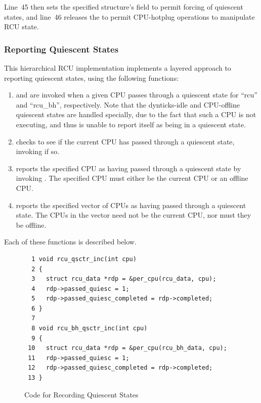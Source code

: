 Line~45 then sets the specified  structure's 
field to permit forcing of quiescent states, and
line~46 releases the  to permit CPU-hotplug
operations to manipulate RCU state.

\subsubsection{Reporting Quiescent States}
\label{app:rcuimpl:rcutreewt:Reporting Quiescent States}

This hierarchical RCU implementation implements a layered approach
to reporting quiescent states, using the following functions:
\begin{enumerate}
\item	{} and 
	are invoked when a given CPU passes through a
	quiescent state for ``rcu'' and ``rcu\_bh'', respectively.
	Note that the dynticks-idle and CPU-offline quiescent states
	are handled specially, due to the fact that such a CPU
	is not executing, and thus is unable to report itself as
	being in a quiescent state.
\item	{} checks to see if the current
	CPU has passed through a quiescent state, invoking 
	if so.
\item	{} reports the specified CPU as having passed
	through a quiescent state by invoking .
	The specified CPU must either be the current CPU or an offline CPU.
\item	{} reports the specified vector of CPUs as
	having passed through a quiescent state.  The CPUs in the
	vector need not be the current CPU, nor must they be offline.
\end{enumerate}

Each of these functions is described below.

\begin{figure}[tbp]
{ \scriptsize
\begin{verbatim}
  1 void rcu_qsctr_inc(int cpu)
  2 {
  3   struct rcu_data *rdp = &per_cpu(rcu_data, cpu);
  4   rdp->passed_quiesc = 1;
  5   rdp->passed_quiesc_completed = rdp->completed;
  6 }
  7
  8 void rcu_bh_qsctr_inc(int cpu)
  9 {
 10   struct rcu_data *rdp = &per_cpu(rcu_bh_data, cpu);
 11   rdp->passed_quiesc = 1;
 12   rdp->passed_quiesc_completed = rdp->completed;
 13 }
\end{verbatim}
}
\caption{Code for Recording Quiescent States}
\label{fig:app:rcuimpl:rcutreewt:Code for Recording Quiescent States}
\end{figure}

